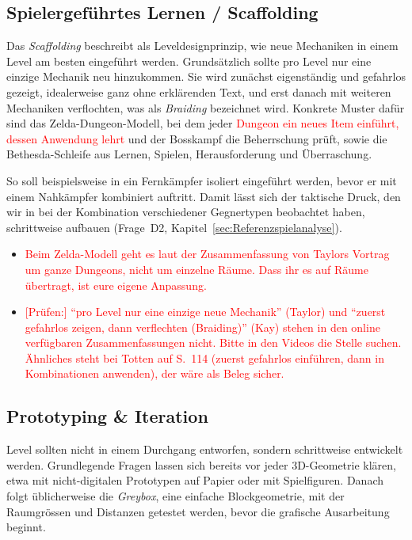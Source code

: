 \documentclass[../Main.tex]{subfiles}
\begin{document}
\subsection{Spielergeführtes Lernen / Scaffolding} \label{sec:Scaffolding}
Das \textit{Scaffolding} beschreibt als Leveldesignprinzip, wie neue Mechaniken in einem Level am besten eingeführt werden.\autocite[114]{totten2014architectural} Grundsätzlich sollte pro Level nur eine einzige Mechanik neu hinzukommen.\autocite{gdc_tenprinciples2010} Sie wird zunächst eigenständig und gefahrlos gezeigt, idealerweise ganz ohne erklärenden Text, und erst danach mit weiteren Mechaniken verflochten, was als \textit{Braiding} bezeichnet wird.\autocite{gdc_movingmountains2020} Konkrete Muster dafür sind das Zelda-Dungeon-Modell, bei dem jeder \textcolor{red}{Dungeon ein neues Item einführt, dessen Anwendung lehrt} und der Bosskampf die Beherrschung prüft, sowie die Bethesda-Schleife aus Lernen, Spielen, Herausforderung und Überraschung.\autocite{gdc_tenprinciples2010}

So soll beispielsweise in  ein Fernkämpfer isoliert eingeführt werden, bevor er mit einem Nahkämpfer kombiniert auftritt. Damit lässt sich der taktische Druck, den wir in  bei der Kombination verschiedener Gegnertypen beobachtet haben, schrittweise aufbauen (Frage~D2, Kapitel~\ref{sec:Referenzspielanalyse}).

\begin{itemize}[leftmargin=1.5cm]
    \item \textcolor{red}{Beim Zelda-Modell geht es laut der Zusammenfassung von Taylors Vortrag um ganze Dungeons, nicht um einzelne Räume. Dass ihr es auf Räume übertragt, ist eure eigene Anpassung.}
    \item \textcolor{red}{[Prüfen:] \enquote{pro Level nur eine einzige neue Mechanik} (Taylor) und \enquote{zuerst gefahrlos zeigen, dann verflechten (Braiding)} (Kay) stehen in den online verfügbaren Zusammenfassungen nicht. Bitte in den Videos die Stelle suchen. Ähnliches steht bei Totten auf S.~114 (zuerst gefahrlos einführen, dann in Kombinationen anwenden), der wäre als Beleg sicher.}
\end{itemize}

\subsection{Prototyping \& Iteration} \label{sec:Prototyping}
Level sollten nicht in einem Durchgang entworfen, sondern schrittweise entwickelt werden. Grundlegende Fragen lassen sich bereits vor jeder 3D-Geometrie klären, etwa mit nicht-digitalen Prototypen auf Papier oder mit Spielfiguren. Danach folgt üblicherweise die \textit{Greybox}, eine einfache Blockgeometrie, mit der Raumgrössen und Distanzen getestet werden, bevor die grafische Ausarbeitung beginnt.\autocite[124--126]{totten2014architectural}
\end{document}
